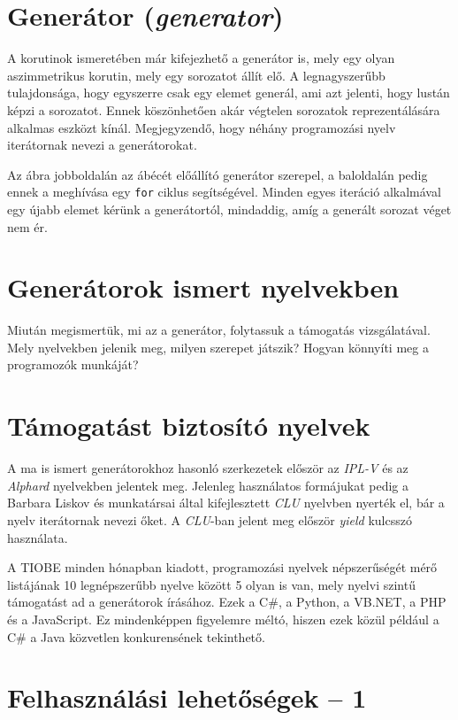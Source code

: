 \documentclass[12pt, a4paper]{article}
\begin{document}
\section{Generátor (\textit{generator})}

A korutinok ismeretében már kifejezhető a generátor is, mely egy olyan aszimmetrikus korutin, mely egy sorozatot állít elő. A legnagyszerűbb tulajdonsága, hogy egyszerre csak egy elemet generál, ami azt jelenti, hogy lustán képzi a sorozatot. Ennek köszönhetően akár végtelen sorozatok reprezentálására alkalmas eszközt kínál. Megjegyzendő, hogy néhány programozási nyelv iterátornak nevezi a generátorokat.

Az ábra jobboldalán az ábécét előállító generátor szerepel, a baloldalán pedig ennek a meghívása egy \texttt{for} ciklus segítségével. Minden egyes iteráció alkalmával egy újabb elemet kérünk a generátortól, mindaddig, amíg a generált sorozat véget nem ér.

\section{Generátorok ismert nyelvekben}

Miután megismertük, mi az a generátor, folytassuk a támogatás vizsgálatával. Mely nyelvekben jelenik meg, milyen szerepet játszik? Hogyan könnyíti meg a programozók munkáját?

\section{Támogatást biztosító nyelvek}

A ma is ismert generátorokhoz hasonló szerkezetek először az \textit{IPL-V} és az \textit{Alphard} nyelvekben jelentek meg. Jelenleg használatos formájukat pedig a Barbara Liskov és munkatársai által kifejlesztett \textit{CLU} nyelvben nyerték el, bár a nyelv iterátornak nevezi őket. A \textit{CLU}-ban jelent meg először \textit{yield} kulcsszó használata.

A TIOBE minden hónapban kiadott, programozási nyelvek népszerűségét mérő listájának 10 legnépszerűbb nyelve között 5 olyan is van, mely nyelvi szintű támogatást ad a generátorok írásához. Ezek a C\#, a Python, a VB.NET, a PHP és a JavaScript. Ez mindenképpen figyelemre méltó, hiszen ezek közül például a C\# a Java közvetlen konkurensének tekinthető.

\section{Felhasználási lehetőségek -- 1}
\end{document}

